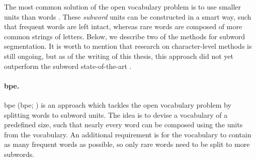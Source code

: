 The most common solution of the open vocabulary problem is to use smaller units
than words \citep{sennrich2016neural}. These \emph{subword} units can be
constructed in a smart way, such that frequent words are left intact, whereas
rare words are composed of more common strings of letters. Below, we describe
two of the methods for subword segmentation. It is worth to mention that
research on character-level methods is still ongoing, but as of the writing of
this thesis, this approach did not yet outperform the subword state-of-the-art
\citep{chung-etal-2016-character,lee-etal-2017-fully,gao-etal-2020-character}.
%
%
%
%
%
%
%
%
%
%
%
%
%
%
%
%
%
%
%
%
%
%
%
%


\paragraph{\acrshort{bpe}.}  \Acrlong{bpe} (\acrshort{bpe};
\citealp{sennrich2016neural}) is an approach which tackles the open vocabulary
problem by splitting words to subword units.  The idea is to devise a
vocabulary of a predefined size, such that nearly every word can be composed
using the units from the vocabulary. An additional requirement is for the
vocabulary to contain as many frequent words as possible, so only rare words
need to be split to more subwords.

